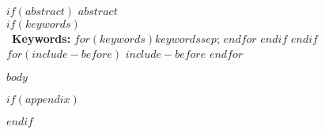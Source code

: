 \documentclass[11 pt,bibliography=totoc,listof=totoc,twoside,open=right]{scrreprt}
\begin{document}
$if(abstract)$
\thispagestyle{empty}
$abstract$\\
$if(keywords)$
\\ \
\textbf{Keywords:} $for(keywords)$$keywords$$sep$; $endfor$
$endif$
$endif$
\newpage \ \thispagestyle{empty} \setcounter{page}{0} \newpage
$for(include-before)$
$include-before$
$endfor$

\setcounter{page}{1}
\tableofcontents
\listoftables
\listoffigures

\newpage
\onehalfspacing
{}


\newpage
{}
\setcounter{page}{0}

$body$

$if(appendix)$

$endif$
\end{document}
